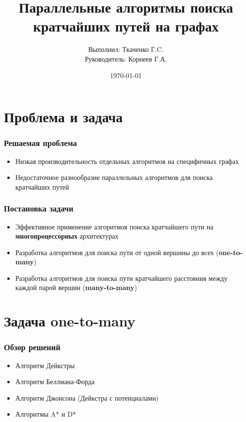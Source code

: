 \documentclass[10pt, compress]{beamer}
\title{Параллельные алгоритмы поиска кратчайших путей на графах}
\subtitle{}
\date{\today}
\author{Выполнил: Ткаченко Г.C. \\ Руководитель: Корнеев Г.А.}
\institute{Университет ИТМО}
\begin{document}
\maketitle

\section{Проблема и задача}
\begin{frame}[fragile]
  \frametitle{Решаемая проблема}

\begin{itemize}
    \item Низкая производительность отдельных алгоритмов на специфичных графах
    \item Недостаточное разнообразие параллельных алгоритмов для поиска кратчайших путей

  \end{itemize}
\end{frame}

\begin{frame}[fragile]
  \frametitle{Постановка задачи}
\begin{itemize}
    \item Эффективное применение алгоритмов поиска кратчайшего пути на \textbf{многопроцессорных} архитектурах
    \item Разработка алгоритмов для поиска пути от одной вершины до всех (\textbf{one-to-many})
    \item Разработка алгоритмов для поиска пути кратчайшего расстояния между каждой парой вершин (\textbf{many-to-many})
  \end{itemize}
\end{frame}

\section{Задача one-to-many}

\begin{frame}[fragile]
  \frametitle{Обзор решений}
\begin{itemize}
    \item Алгоритм Дейкстры
    \item Алгоритм Беллмана-Форда
    \item Алгоритм Джонсона (Дейкстра с потенциалами)
    \item Алгоритмы A* и D*
  \end{itemize}
\end{frame}
\end{document}
